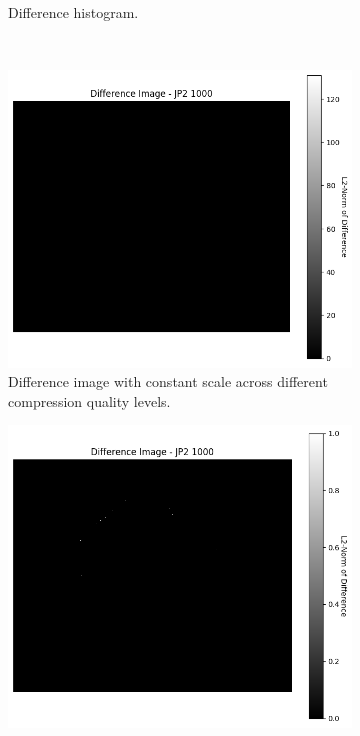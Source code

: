 \begin{figure}[htb]
\begin{subfigure}[b]{0.48\textwidth}
        \caption{Difference histogram.}
        \label{fig:img_quality_comp_jp2_1000_histo}
    \end{subfigure}
    \\
    \begin{subfigure}[b]{0.48\textwidth}
        \centering
        \includegraphics[width=\textwidth]{doc/thesis/0_figures/compare_quality/set1/jp2_1000_diff_heatmap.png}
        \caption{Difference image with constant scale across different compression quality levels.}
        \label{fig:img_quality_comp_jp2_1000_diff}
    \end{subfigure}
    \begin{subfigure}[b]{0.48\textwidth}
        \centering
        \includegraphics[width=\textwidth]{doc/thesis/0_figures/compare_quality/set1/jp2_1000_diff_heatmap_rel.png}

\end{subfigure}
\end{figure}
